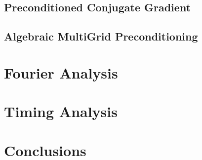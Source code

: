 \documentclass[preprint,review,12pt]{elsarticle}
\begin{document}
\subsection{Preconditioned Conjugate Gradient} \label{sec::solving_PCG}

\subsection{Algebraic MultiGrid Preconditioning} \label{sec::solving_AMG}

\section{Fourier Analysis} \label{sec::fourier}



\section{Timing Analysis} \label{sec::timing}

\section{Conclusions} \label{sec::conclusions}


\pagebreak



\end{document}
